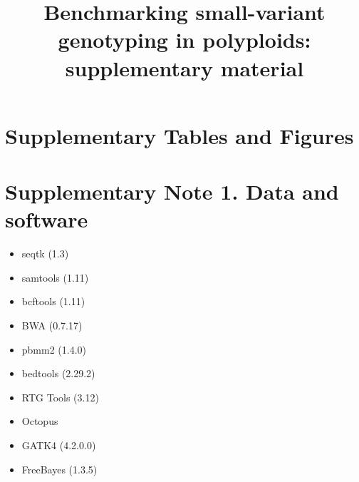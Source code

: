 \documentclass{article}
\title{Benchmarking small-variant genotyping in polyploids: supplementary material}
\author{}
\date{}
\begin{document}
\maketitle

\tableofcontents

\clearpage

\section{Supplementary Tables and Figures}

\clearpage

\section{Supplementary Note 1. Data and software}

\begin{itemize}
    \item seqtk (1.3)
    \item samtools (1.11)
    \item bcftools (1.11)
    \item BWA (0.7.17)
    \item pbmm2 (1.4.0)
    \item bedtools (2.29.2)
    \item RTG Tools (3.12)
    \item Octopus
    \item GATK4 (4.2.0.0)
    \item FreeBayes (1.3.5)
\end{itemize}



\end{document}
